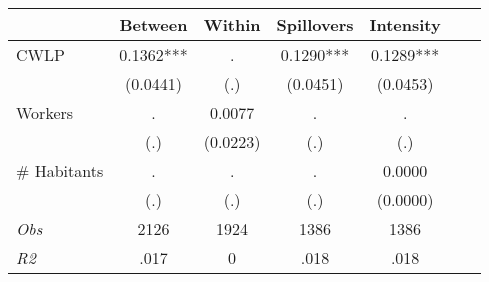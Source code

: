 \begin{tabular}{l*{6}{c}}\hline&\multicolumn{1}{c}{Between}&\multicolumn{1}{c}{Within}&\multicolumn{1}{c}{Spillovers}&\multicolumn{1}{c}{Intensity}\\ \hline 
CWLP & 0.1362*** & . & 0.1290*** & 0.1289*** \\
 & (0.0441) & (.) & (0.0451) & (0.0453) \\
Workers & . & 0.0077 & . & . \\
 & (.) & (0.0223) & (.) & (.) \\
\# Habitants & . & . & . & 0.0000 \\
  & (.) & (.) & (.) & (0.0000) \\
\hline \textit{Obs} & 2126 & 1924 & 1386 & 1386  \\ \textit{R2} & .017 & 0 & .018 & .018 \\ \hline \end{tabular}
